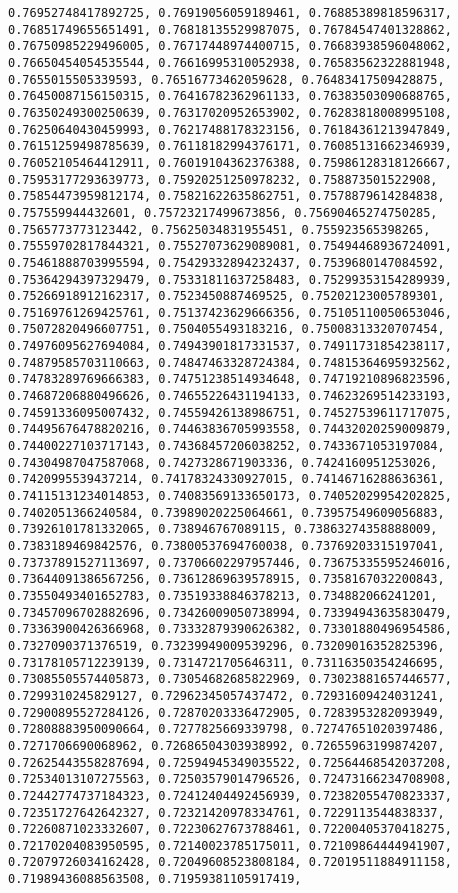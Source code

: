 \documentclass[11pt]{article}
\begin{document}
\begin{Verbatim}[commandchars=\\\{\}]
0.76952748417892725, 0.76919056059189461, 0.76885389818596317, 0.76851749655651491, 0.76818135529987075, 0.76784547401328862, 0.76750985229496005, 0.76717448974400715, 0.76683938596048062, 0.76650454054535544, 0.76616995310052938, 0.76583562322881948, 0.7655015505339593, 0.76516773462059628, 0.76483417509428875, 0.76450087156150315, 0.76416782362961133, 0.76383503090688765, 0.76350249300250639, 0.76317020952653902, 0.76283818008995108, 0.76250640430459993, 0.76217488178323156, 0.76184361213947849, 0.76151259498785639, 0.76118182994376171, 0.76085131662346939, 0.76052105464412911, 0.76019104362376388, 0.75986128318126667, 0.75953177293639773, 0.75920251250978232, 0.758873501522908, 0.75854473959812174, 0.75821622635862751, 0.7578879614284838, 0.757559944432601, 0.75723217499673856, 0.75690465274750285, 0.7565773773123442, 0.75625034831955451, 0.755923565398265, 0.75559702817844321, 0.75527073629089081, 0.75494468936724091, 0.75461888703995594, 0.75429332894232437, 0.7539680147084592, 0.75364294397329479, 0.75331811637258483, 0.75299353154289939, 0.75266918912162317, 0.7523450887469525, 0.75202123005789301, 0.75169761269425761, 0.75137423629666356, 0.75105110050653046, 0.75072820496607751, 0.7504055493183216, 0.75008313320707454, 0.74976095627694084, 0.74943901817331537, 0.74911731854238117, 0.74879585703110663, 0.74847463328724384, 0.74815364695932562, 0.74783289769666383, 0.74751238514934648, 0.74719210896823596, 0.74687206880496626, 0.74655226431194133, 0.74623269514233193, 0.74591336095007432, 0.74559426138986751, 0.74527539611717075, 0.74495676478820216, 0.74463836705993558, 0.74432020259009879, 0.74400227103717143, 0.74368457206038252, 0.7433671053197084, 0.74304987047587068, 0.7427328671903336, 0.7424160951253026, 0.7420995539437214, 0.74178324330927015, 0.74146716288636361, 0.74115131234014853, 0.74083569133650173, 0.74052029954202825, 0.7402051366240584, 0.73989020225064661, 0.73957549609056883, 0.73926101781332065, 0.738946767089115, 0.73863274358888009, 0.7383189469842576, 0.73800537694760038, 0.73769203315197041, 0.73737891527113697, 0.73706602297957446, 0.73675335595246016, 0.73644091386567256, 0.73612869639578915, 0.7358167032200843, 0.73550493401652783, 0.73519338846378213, 0.734882066241201, 0.73457096702882696, 0.73426009050738994, 0.73394943635830479, 0.73363900426366968, 0.73332879390626382, 0.73301880496954586, 0.7327090371376519, 0.73239949009539296, 0.73209016352825396, 0.73178105712239139, 0.7314721705646311, 0.73116350354246695, 0.73085505574405873, 0.73054682685822969, 0.73023881657446577, 0.7299310245829127, 0.72962345057437472, 0.72931609424031241, 0.72900895527284126, 0.72870203336472905, 0.7283953282093949, 0.72808883950090664, 0.7277825669339798, 0.72747651020397486, 0.7271706690068962, 0.72686504303938992, 0.72655963199874207, 0.72625443558287694, 0.72594945349035522, 0.72564468542037208, 0.72534013107275563, 0.72503579014796526, 0.72473166234708908, 0.72442774737184323, 0.72412404492456939, 0.72382055470823337, 0.72351727642642327, 0.72321420978334761, 0.7229113544838337, 0.72260871023332607, 0.72230627673788461, 0.72200405370418275, 0.72170204083950595, 0.72140023785175011, 0.72109864444941907, 0.72079726034162428, 0.72049608523808184, 0.72019511884911158, 0.71989436088563508, 0.71959381105917419, 
\end{Verbatim}
\end{document}
